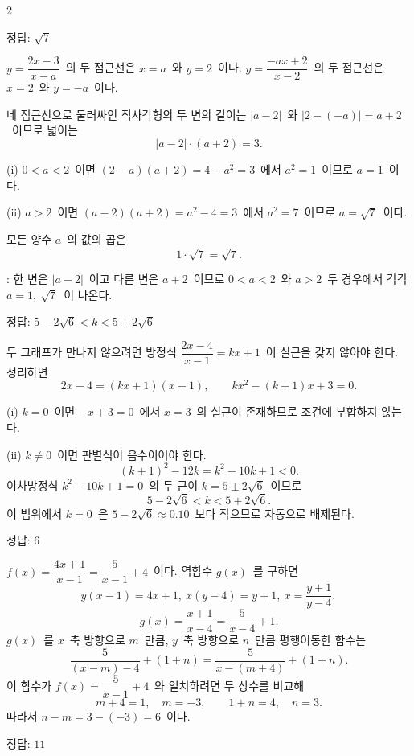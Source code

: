 \documentclass[10pt,fleqn]{article}
\begin{document}
\begin{multicols*}{2}
\begin{dmanswerbox}
정답: $\sqrt{7}$
\end{dmanswerbox}

$y=\dfrac{2x-3}{x-a}$\ 의 두 점근선은 $x=a$\ 와 $y=2$\ 이다. $y=\dfrac{-ax+2}{x-2}$\ 의 두 점근선은 $x=2$\ 와 $y=-a$\ 이다.

네 점근선으로 둘러싸인 직사각형의 두 변의 길이는 $|a-2|$\ 와 $|2-(-a)|=a+2$\ 이므로 넓이는
\[ |a-2|\cdot(a+2)=3. \]

\smallskip
(i) $0<a<2$\ 이면 $(2-a)(a+2)=4-a^{2}=3$\ 에서 $a^{2}=1$\ 이므로 $a=1$\ 이다.

\smallskip
(ii) $a>2$\ 이면 $(a-2)(a+2)=a^{2}-4=3$\ 에서 $a^{2}=7$\ 이므로 $a=\sqrt{7}$\ 이다.

\smallskip
모든 양수 $a$\ 의 값의 곱은
\[ 1\cdot\sqrt{7}=\sqrt{7}. \]

\begin{dmcriticalpoint}
: 한 변은 $|a-2|$\ 이고 다른 변은 $a+2$\ 이므로 $0<a<2$\ 와 $a>2$\ 두 경우에서 각각 $a=1,\ \sqrt{7}$\ 이 나온다.
\end{dmcriticalpoint}

\begin{dmanswerbox}
정답: $5-2\sqrt{6}<k<5+2\sqrt{6}$
\end{dmanswerbox}

두 그래프가 만나지 않으려면 방정식 $\dfrac{2x-4}{x-1}=kx+1$\ 이 실근을 갖지 않아야 한다. 정리하면
\[ 2x-4=(kx+1)(x-1),\qquad kx^{2}-(k+1)x+3=0. \]

\smallskip
(i) $k=0$\ 이면 $-x+3=0$\ 에서 $x=3$\ 의 실근이 존재하므로 조건에 부합하지 않는다.

\smallskip
(ii) $k\ne 0$\ 이면 판별식이 음수이어야 한다.
\[ (k+1)^{2}-12k=k^{2}-10k+1<0. \]
이차방정식 $k^{2}-10k+1=0$\ 의 두 근이 $k=5\pm 2\sqrt{6}$\ 이므로
\[ 5-2\sqrt{6}<k<5+2\sqrt{6}. \]
이 범위에서 $k=0$\ 은 $5-2\sqrt{6}\approx 0.10$\ 보다 작으므로 자동으로 배제된다.
\begin{dmanswerbox}
정답: $6$
\end{dmanswerbox}

$f(x)=\dfrac{4x+1}{x-1}=\dfrac{5}{x-1}+4$\ 이다. 역함수 $g(x)$\ 를 구하면
\[ y(x-1)=4x+1,\ x(y-4)=y+1,\ x=\dfrac{y+1}{y-4}, \]
\[ g(x)=\dfrac{x+1}{x-4}=\dfrac{5}{x-4}+1. \]
$g(x)$\ 를 $x$\ 축 방향으로 $m$\ 만큼, $y$\ 축 방향으로 $n$\ 만큼 평행이동한 함수는
\[ \dfrac{5}{(x-m)-4}+(1+n)=\dfrac{5}{x-(m+4)}+(1+n). \]
이 함수가 $f(x)=\dfrac{5}{x-1}+4$\ 와 일치하려면 두 상수를 비교해
\[ m+4=1,\quad m=-3,\qquad 1+n=4,\quad n=3. \]
따라서 $n-m=3-(-3)=6$\ 이다.
\begin{dmanswerbox}
정답: $11$
\end{dmanswerbox}


\end{multicols*}
\end{document}
